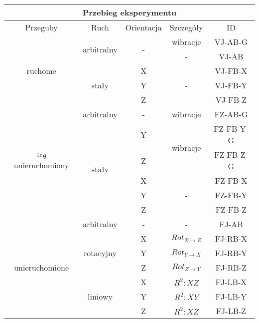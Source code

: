 \documentclass[10pt,a4paper]{article}
\begin{document}
\begin{center}
	\begin{tabular}{c||c|c|c|c}
		\multicolumn{5}{c}{\textbf{Przebieg eksperymentu}} \\ \hline \hline \hline
		Przeguby & Ruch & Orientacja & Szczegóły & ID\\ \hline \hline
		
		\multirow{5}{*}{ruchome} & \multirow{2}{*}{arbitralny} & \multirow{2}{*}{-} & wibracje & VJ-AB-G \\ \cline{4-5}
		& & & - & VJ-AB \\ \cline{2-5}
		& \multirow{3}{*}{stały} &  X &  \multirow{3}{*}{-} & VJ-FB-X \\ \cline{3-3} \cline{5-5}
		& &  Y & & VJ-FB-Y \\ \cline{3-3}  \cline{5-5}
		& &  Z & & VJ-FB-Z \\ \hline \hline
		
		\multirow{6}{*}{$^{1z}\theta$ unieruchomiony} & arbitralny & - & wibracje & FZ-AB-G \\ \cline{2-5}
		& \multirow{5}{*}{stały} &  Y &  \multirow{2}{*}{wibracje} & FZ-FB-Y-G \\ \cline{3-3}  \cline{5-5}
		& &  Z & & FZ-FB-Z-G \\ \cline{3-5}  \cline{5-5}
		& &  X &  \multirow{3}{*}{-} & FZ-FB-X \\ \cline{3-3}  \cline{5-5}	
		& &  Y & & FZ-FB-Y \\ \cline{3-3}  \cline{5-5}
		& &  Z & & FZ-FB-Z \\ \hline \hline
		
		\multirow{7}{*}{unieruchomione} & arbitralny & - & - &  FJ-AB \\ \cline{2-5}
		& \multirow{3}{*}{rotacyjny} &  X & $Rot_{X \rightarrow Z}$ & FJ-RB-X \\ \cline{3-5}
		& &  Y & $Rot_{Y \rightarrow X}$ & FJ-RB-Y \\ \cline{3-5}
		& &  Z & $Rot_{Z \rightarrow Y}$ & FJ-RB-Z \\ \cline{2-5}
		& \multirow{3}{*}{liniowy} &  X &  $R^{2}: XZ$ &  FJ-LB-X \\ \cline{3-5}
		& &  Y &  $R^{2}: XY$ & FJ-LB-Y \\ \cline{3-5}
		& &  Z &  $R^{2}: XZ$ & FJ-LB-Z \\ 
	\end{tabular}
\end{center}
\end{document}

